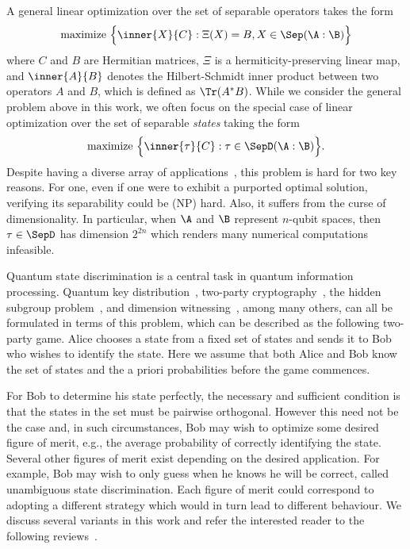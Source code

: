 A general linear optimization over the set of separable operators takes the form 
\begin{equation} \label{eq:ch2_SEP-Sep_opt_operator} 
\text{maximize } \Big\{ \inner{X}{C} : \Xi(X) = B, X \in \Sep(\A:\B) \Big\} 
\end{equation} 
where $C$ and $B$ are Hermitian matrices, $\Xi$ is a hermiticity-preserving linear map, and $\inner{A}{B}$ denotes the Hilbert-Schmidt inner product between two operators $A$ and $B$, which is defined as $\Tr(A^* B)$.  
While we consider the general problem above in this work, we often focus on the special case of linear optimization over the set of separable \emph{states} taking the form 
\begin{equation} \label{eq:ch2_SEP-Sep_opt} 
\text{maximize } \Big\{ \inner{\tau}{C} : \tau \in \SepD(\A:\B) \Big\}.  
\end{equation} 
Despite having a diverse array of applications~\cite{ioannou2007computational, brandao2011quasipolynomial, gharibian2013qma, chailloux2012complexity, hayden2013two, li2014quantum, consiglio2022variational, jeronimo2023power}, 
this problem is hard for two key reasons.   
For one, even if one were to exhibit a purported optimal solution, verifying its separability could be (NP) hard. 
Also, it suffers from the curse of dimensionality. 
In particular, when $\A$ and $\B$ represent $n$-qubit spaces, then $\tau \in \SepD$ has dimension $2^{2n}$ which renders many numerical computations infeasible. 

Quantum state discrimination is a central task in quantum information processing.
Quantum key distribution~\cite{ko2018advanced}, two-party cryptography~\cite{aharonov2000quantum, ambainis2001new, sikora2017simple}, the hidden subgroup problem~\cite{hayashi2008quantum}, and dimension witnessing~\cite{strubi2013measuring}, among many others, can all be formulated in terms of this problem, which can be described as the following two-party game.
Alice chooses a state from a fixed set of states and sends it to Bob who wishes to identify the state. 
Here we assume that both Alice and Bob know the set of states and the a priori probabilities before the game commences.

For Bob to determine his state perfectly, the necessary and sufficient condition is that the states in the set must be pairwise orthogonal.
However this need not be the case and, in such circumstances, Bob may wish to optimize some desired figure of merit, e.g., the average probability of correctly identifying the state.
Several other figures of merit exist depending on the desired application.
For example, Bob may wish to only guess when he knows he will be correct, called unambiguous state discrimination.
Each figure of merit could correspond to adopting a different strategy which would in turn lead to different behaviour.  
We discuss several variants in this work and refer the interested reader to the following reviews~\cite{chefles2000quantum, bergou200411, bergou2007quantum, barnett2009quantum, bergou2010discrimination}. 

